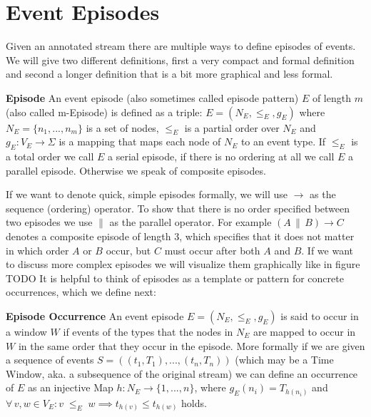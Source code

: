 
\section{Event Episodes}

Given an annotated stream there are multiple ways to define episodes of events. We will give two different definitions, first a very compact and formal definition and second a longer definition that is a bit more graphical and less formal.

\begin{mydef}
\textbf{Episode} An event episode (also sometimes called episode pattern) $E$ of length $m$ (also called m-Episode) is defined as a triple: $E = (N_E,{\leq}_{E},g_E)$ where $N_E = \{n_1,...,n_m\}$ is a set of nodes, ${\leq}_{E}$ is a partial order over $N_E$ and $g_E : V_E \rightarrow \Sigma$ is a mapping that maps each node of $N_E$ to an event type. If ${\leq}_{E}$ is a total order we call $E$ a serial episode, if there is no ordering at all we call $E$ a parallel episode. Otherwise we speak of composite episodes.
\end{mydef}

If we want to denote quick, simple episodes formally, we will use $\rightarrow$ as the sequence (ordering) operator. To show that there is no order specified between two episodes we use $\|$ as the parallel operator. For example $(A \, \| \, B ) \rightarrow C$ denotes a composite episode of length 3, which specifies that it does not matter in which order $A$ or $B$ occur, but $C$ must occur after both $A$ and $B$. If we want to discuss more complex episodes we will visualize them graphically like in figure TODO \newline  
It is helpful to think of episodes as a template or pattern for concrete occurrences, which we define next:

\begin{mydef}
\textbf{Episode Occurrence} An event episode $E = (N_E,{\leq}_{E},g_E)$ is said to occur in a window $W$ if events of the types that the nodes in $N_E$ are mapped to occur in $W$ in the same order that they occur in the episode. More formally if we are given a sequence of events $S=((t_1,T_1),...,(t_n,T_n))$ (which may be a Time Window, aka. a subsequence of the original stream) we can define an occurrence of $E$ as an injective Map $h:N_E \rightarrow \{1,...,n\}$, where $g_E(n_i) = T_{h(n_i)}$ and $\forall \, v,w \in V_E : v \;{\leq}_{E}\; w \implies t_{h(v)} \leq t_{h(w)}$ holds.
\end{mydef}

